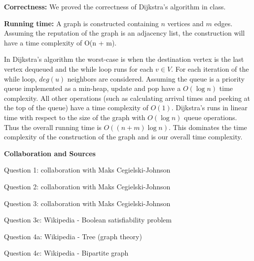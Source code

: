 \documentclass[11pt]{article}
\newcommand\correctness{\vspace{.10in}\textbf{Correctness: }}
\newcommand\runtime{\vspace{.10in}\textbf{Running time: }}
\begin{document}
\correctness We proved the correctness of Dijkstra's algorithm in class.

\runtime A graph is constructed containing $n$ vertices and $m$ edges. Assuming the reputation of the graph is an adjacency list, the construction will have a time complexity of O(n + m).

	In Dijkstra's algorithm the worst-case is when the destination vertex is the last vertex dequeued and the while loop runs for each $v \in V$. For each iteration of the while loop, $deg(u)$ neighbors are considered. Assuming the queue is a priority queue implemented as a min-heap, update and pop have a $O(\log n)$ time complexity. All other operations (such as calculating arrival times and peeking at the top of the queue) have a time complexity of $O(1)$. Dijkstra's runs in linear time with respect to the size of the graph with $O(\log n)$ queue operations. Thus the overall running time is $O((n + m)\log n)$. This dominates the time complexity of the construction of the graph and is our overall time complexity.
	
	
\newpage	
\textbf{\huge Collaboration and Sources}
\newline

Question 1: collaboration with Maks Cegielski-Johnson

Question 2: collaboration with Maks Cegielski-Johnson

Question 3: collaboration with Maks Cegielski-Johnson

Question 3c: Wikipedia - Boolean satisfiability problem

Question 4a: Wikipedia - Tree (graph theory)

Question 4c: Wikipedia - Bipartite graph
\end{document}
